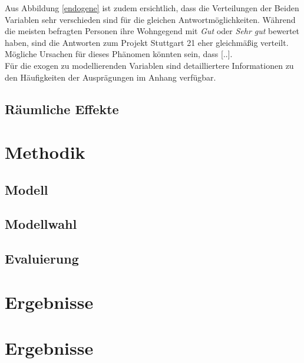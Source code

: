 \documentclass{Vorlage}
\begin{document}
Aus Abbildung \ref{endogene} ist zudem ersichtlich, dass die Verteilungen der Beiden Variablen sehr verschieden sind für die gleichen Antwortmöglichkeiten. Während die meisten befragten Personen ihre Wohngegend mit \textit{Gut} oder \textit{Sehr gut} bewertet haben, sind die Antworten zum Projekt Stuttgart 21 eher gleichmäßig verteilt. Mögliche Ursachen für dieses Phänomen könnten sein, dass [..].\\
Für die exogen zu modellierenden Variablen sind detailliertere Informationen zu den Häufigkeiten der Ausprägungen im Anhang verfügbar. 


\subsection{Räumliche Effekte}



\section{Methodik}

\subsection{Modell}

\subsection{Modellwahl}

\subsection{Evaluierung}

\section{Ergebnisse}




\section{Ergebnisse}

\clearpage



 
\end{document}
